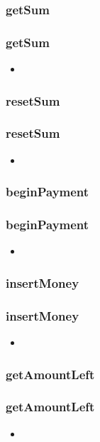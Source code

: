 \documentclass[final]{beamer}
\begin{document}
\subsubsection{getSum}
\begin{frame}
	\frametitle{getSum}
	\begin{itemize}
		\item{}
	\end{itemize}
\end{frame}

\subsubsection{resetSum}
\begin{frame}
	\frametitle{resetSum}
	\begin{itemize}
		\item{}
	\end{itemize}
\end{frame}

\subsubsection{beginPayment}
\begin{frame}
	\frametitle{beginPayment}
	\begin{itemize}
		\item{}
	\end{itemize}
\end{frame}

\subsubsection{insertMoney}
\begin{frame}
	\frametitle{insertMoney}
	\begin{itemize}
		\item{}
	\end{itemize}
\end{frame}

\subsubsection{getAmountLeft}
\begin{frame}
	\frametitle{getAmountLeft}
	\begin{itemize}
		\item{}
	\end{itemize}
\end{frame}
\end{document}
